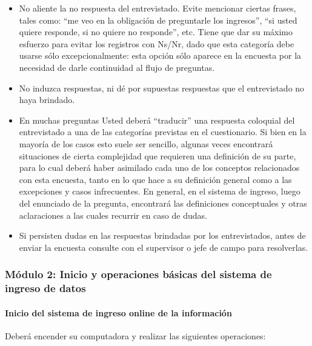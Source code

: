 \documentclass[
  openany]{book}
\begin{document}
\begin{itemize}
\item
  No aliente la no respuesta del entrevistado. Evite mencionar ciertas frases, tales como: ``me veo en la obligación de preguntarle los ingresos'', ``si usted quiere responde, si no quiere no responde'', etc. Tiene que dar su máximo esfuerzo para evitar los registros con Ns/Nr, dado que esta categoría debe usarse sólo excepcionalmente: esta opción sólo aparece en la encuesta por la necesidad de darle continuidad al flujo de preguntas.
\item
  No induzca respuestas, ni dé por supuestas respuestas que el entrevistado no haya brindado.
\item
  En muchas preguntas Usted deberá ``traducir'' una respuesta coloquial del entrevistado a una de las categorías previstas en el cuestionario. Si bien en la mayoría de los casos esto suele ser sencillo, algunas veces encontrará situaciones de cierta complejidad que requieren una definición de su parte, para lo cual deberá haber asimilado cada uno de los conceptos relacionados con esta encuesta, tanto en lo que hace a su definición general como a las excepciones y casos infrecuentes. En general, en el sistema de ingreso, luego del enunciado de la pregunta, encontrará las definiciones conceptuales y otras aclaraciones a las cuales recurrir en caso de dudas.
\item
  Si persisten dudas en las respuestas brindadas por los entrevistados, antes de enviar la encuesta consulte con el supervisor o jefe de campo para resolverlas.
\end{itemize}

\hypertarget{muxf3dulo-2-inicio-y-operaciones-buxe1sicas-del-sistema-de-ingreso-de-datos}{%
\subsubsection{Módulo 2: Inicio y operaciones básicas del sistema de ingreso de datos}\label{muxf3dulo-2-inicio-y-operaciones-buxe1sicas-del-sistema-de-ingreso-de-datos}}

\hypertarget{inicio-del-sistema-de-ingreso-online-de-la-informaciuxf3n}{%
\paragraph{Inicio del sistema de ingreso online de la información}\label{inicio-del-sistema-de-ingreso-online-de-la-informaciuxf3n}}

Deberá encender su computadora y realizar las siguientes operaciones:
\end{document}
